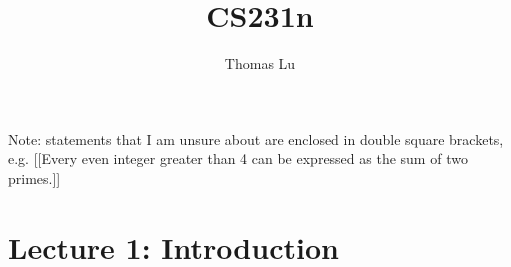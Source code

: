 \documentclass{article}
\title{CS231n}
\author{Thomas Lu}
\date{}
\begin{document}
\maketitle
Note: statements that I am unsure about are enclosed in double square brackets, e.g. [[Every even integer greater than 4 can be expressed as the sum of two primes.]]
\section{Lecture 1: Introduction}

\end{document}
